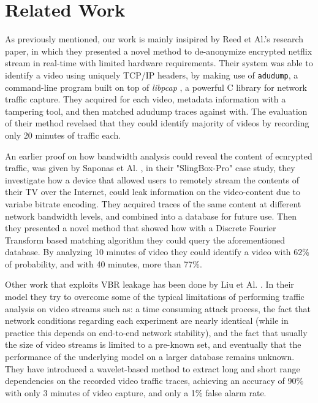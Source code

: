 \section{Related Work}\label{related}

As previously mentioned, our work is mainly insipired by Reed et Al.'s
\cite{netflix-real-time} research paper, in which they presented a novel method
to de-anonymize encrypted netflix stream in real-time with limited hardware
requirements. Their system was able to identify a video using uniquely TCP/IP
headers, by making use of \texttt{adudump}, a command-line program built on top
of \emph{libpcap} \cite{libpcap}, a powerful C library for network traffic
capture. They acquired for each video, metadata information with a tampering
tool, and then matched adudump traces against with. The evaluation of their
method revelaed that they could identify majority of videos by recording only
20 minutes of traffic each.

An earlier proof on how bandwidth analysis could reveal the content of
ecnrypted traffic, was given by Saponas et Al. \cite{Saponas2007devices}, in
their "SlingBox-Pro" case study, they investigate how a device that allowed
users to remotely stream the contents of their TV over the Internet, could leak
information on the video-content due to variabe bitrate encoding. They acquired
traces of the same content at different network bandwidth levels, and combined
into a database for future use. Then they presented a novel method that showed
how with a Discrete Fourier Transform based matching algorithm they could query
the aforementioned database. By analyzing 10 minutes of video they could
identify a video with 62\% of probability, and with 40 minutes, more than 77\%.

Other work that exploits VBR leakage has been done by Liu et Al.
\cite{forensic}.  In their model they try to overcome some of the typical
limitations of performing traffic analysis on video streams such as: a time
consuming attack process, the fact that network conditions regarding each
experiment are nearly identical (while in practice this depends on end-to-end
network stability), and the fact that usually the size of video streams is
limited to a pre-known set, and eventually that the performance of the
underlying model on a larger database remains unknown. They have introduced a
wavelet-based method to extract long and short range dependencies on the
recorded video traffic traces, achieving an accuracy of 90\% with only 3
minutes of video capture, and only a 1\% false alarm rate.

